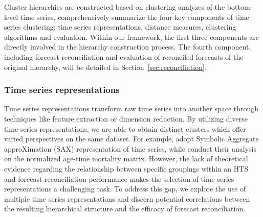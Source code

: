 \documentclass[a4paper,review,12pt,authoryear]{elsarticle}
\begin{document}
Cluster hierarchies are constructed based on clustering analyzes of the bottom-level time series. 
\cite{aghabozorgiTimeseriesClusteringDecade2015a} comprehensively summarize the four key components of time series clustering: time series representations, distance measures, clustering algorithms and evaluation. Within our framework, the first three components are directly involved in the hierarchy construction process. The fourth component, including forecast reconciliation and evaluation of reconciled forecasts of the original hierarchy, will be detailed in Section~\ref{sec:reconciliation}.

\subsubsection*{Time series representations}

Time series representations transform raw time series into another space through techniques like feature extraction or dimension reduction. By utilizing diverse time series representations, we are able to obtain distinct clusters which offer varied perspectives on the same dataset. For example, \cite{pangHierarchicalElectricityTime2022} adopt Symbolic Aggregate approXimation (SAX) representation of time series, while \cite{liForecastReconciliationApproach2019} conduct their analysis on the normalized age-time mortality matrix.
However, the lack of theoretical evidence regarding the relationship between specific groupings within an HTS and forecast reconciliation performance makes the selection of time series representations a challenging task. To address this gap, we explore the use of multiple time series representations and discern potential correlations between the resulting hierarchical structure and the efficacy of forecast reconciliation.
\end{document}
